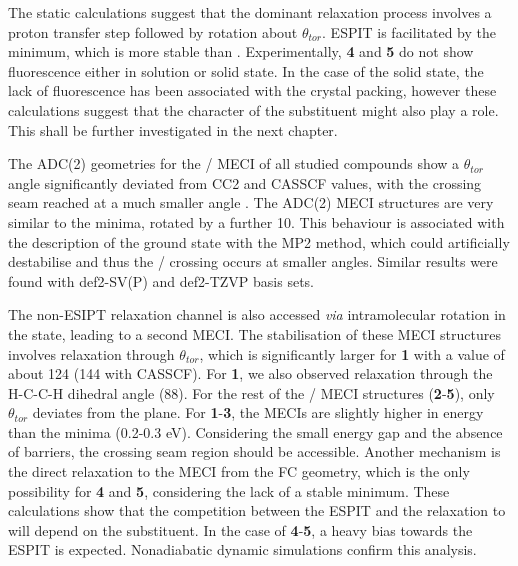 The static calculations suggest that the dominant relaxation process involves a proton transfer step followed by rotation about $\theta_{tor}$. ESPIT is facilitated by the \Kstar{} minimum, which is more stable than \Estar. Experimentally, \textbf{4} and \textbf{5} do not show fluorescence either in solution or solid state. In the case of the solid state, the lack of fluorescence has been associated with the crystal packing, however these calculations suggest that the character of the substituent might also play a role. This shall be further investigated in the next chapter.

The ADC(2) geometries for the \Kstar{} \sone/\szero{} MECI of all studied compounds show a $\theta_{tor}$ angle significantly deviated from CC2 and CASSCF values, with the crossing seam reached at a much smaller angle . The ADC(2) MECI structures are very similar to the \Kstar{} minima, rotated by a further 10\textdegree{}. This behaviour is associated with the description of the ground state with the MP2 method, which could artificially destabilise \szero{} and thus the \sone/\szero{}  crossing occurs at smaller angles. Similar results were found with def2-SV(P) and def2-TZVP basis sets.

The non-ESIPT relaxation channel is also accessed \textit{via} intramolecular rotation in the \Estar{} state, leading to a second MECI. The stabilisation of these MECI structures involves relaxation through $\theta_{tor}$, which is significantly larger for \textbf{1} with a value of about 124\textdegree{} (144\textdegree{} with CASSCF). For \textbf{1}, we also observed relaxation through the H-C-C-H dihedral angle (88\textdegree{}). For the rest of the \sone/\szero{} MECI structures (\textbf{2}-\textbf{5}), only $\theta_{tor}$ deviates from the plane. For \textbf{1}-\textbf{3}, the \Estar{} MECIs are slightly higher in energy than the \Estar{} minima (0.2-0.3 eV).  Considering the small energy gap and the absence of barriers, the crossing seam region should be accessible. Another mechanism is the direct relaxation to the MECI from the FC geometry, which is the only possibility for \textbf{4} and \textbf{5}, considering the lack of a stable \Estar{} minimum. These calculations show that the competition between the ESPIT and the relaxation to \Estar{} will depend on the substituent. In the case of \textbf{4}-\textbf{5}, a heavy bias towards the ESPIT is expected. Nonadiabatic dynamic simulations confirm this analysis. 
